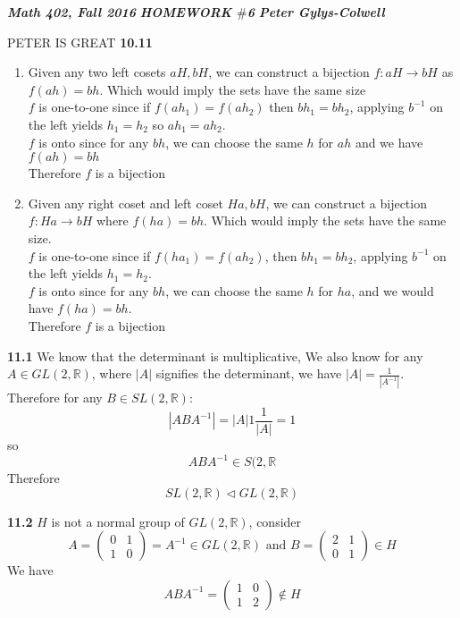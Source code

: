 \documentclass[12pt]{article}
\newenvironment{ques}{\vspace{2 ex}}{\vspace{2 ex}}
\theoremstyle{definition}
\begin{document}
\noindent \textit{\textbf{Math 402, Fall 2016}} \hspace{1.3cm}
\textit{\textbf{HOMEWORK $\#$6}} \hspace{1.3cm} \textit{\textbf{Peter
Gylys-Colwell}} 

\vspace{1cm}


PETER IS GREAT
\begin{ques}
	\textbf{10.11}
		\begin{enumerate}
			\item
				Given any two left cosets $aH, bH$, we can
				construct a bijection $f : aH \to bH$ as
				$f(ah) = bh$. Which would imply the sets have
				the same size \\
				$f$ is one-to-one since if $f(ah_1) = f(ah_2)$
				then $bh_1 = bh_2$, applying $b^{-1}$ on the
				left yields $h_1 = h_2$ so $ah_1 = ah_2$.\\
				$f$ is onto since for any $bh$, we can choose the
				same $h$ for $ah$ and we have $f(ah) = bh$\\
				Therefore $f$ is a bijection
			\item
				Given any right coset and left coset $Ha, bH$,
				we can construct a bijection $f : Ha \to bH$
				where $f(ha) = bh$. Which would imply the sets
				have the same size.\\
				$f$ is one-to-one since if $f(ha_1) = f(ah_2)$,
				then $bh_1 = bh_2$, applying $b^{-1}$ on the
				left yields $h_1 = h_2$.\\
				$f$ is onto since for any $bh$, we can choose
				the same $h$ for $ha$, and we would have $f(ha)
				= bh$.\\
				Therefore $f$ is a bijection
		\end{enumerate}

\end{ques}

\begin{ques}
	\textbf{11.1}
		We know that the determinant is multiplicative, We also know
		for any $A \in GL(2,\mathbb{R})$, where $|A|$ signifies the
		determinant, we have $|A| = \frac{1}{|A^{-1}|}$.\\
		Therefore for any $B \in SL(2, \mathbb{R})$:
		$$|ABA^{-1}| = |A|1\frac{1}{|A|} = 1$$
		so
		$$ABA^{-1} \in S(2,\mathbb{R}$$
		Therefore
		$$SL(2,\mathbb{R}) \triangleleft GL(2, \mathbb{R})$$
\end{ques}

\begin{ques}
	\textbf{11.2}
		$H$ is not a normal group of $GL(2,\mathbb{R})$, consider
		$$A =\left (\begin{array}{cc}
			0 & 1\\
			1 & 0
		\end{array}\right) = A^{-1} \in GL(2,\mathbb{R}) \text{ and } 
		B = \left (\begin{array}{cc}
			2 & 1\\
			0 & 1 
		\end{array}\right) \in H$$
		We have
		$$ABA^{-1} = \left(\begin{array}{cc}
			1 & 0\\
			1 & 2
		\end{array}\right) \notin H$$
\end{ques}
\end{document}
